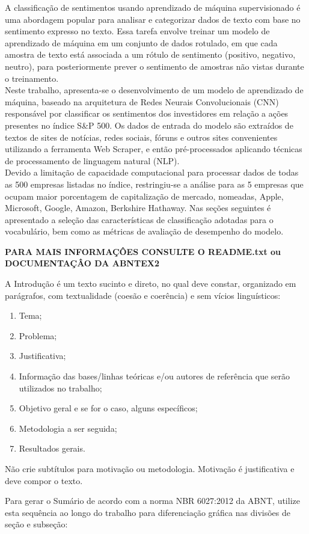 A classificação de sentimentos usando aprendizado de máquina supervisionado é uma abordagem popular para analisar e categorizar dados de texto com base no sentimento expresso no texto. Essa tarefa envolve treinar um modelo de aprendizado de máquina em um conjunto de dados rotulado, em que cada amostra de texto está associada a um rótulo de sentimento (positivo, negativo, neutro), para posteriormente prever o sentimento de amostras não vistas durante o treinamento.\\
Neste trabalho, apresenta-se o desenvolvimento de um modelo de aprendizado de máquina, baseado na arquitetura de Redes Neurais Convolucionais (CNN) responsável por classificar os sentimentos dos investidores em relação a ações presentes no índice S&P 500. Os dados de entrada do modelo são extraídos de textos de sites de notícias, redes sociais, fóruns e outros sites convenientes utilizando a ferramenta Web Scraper, e então pré-processados aplicando técnicas de processamento de linguagem natural (NLP).\\
Devido a limitação de capacidade computacional para processar dados de todas as 500 empresas listadas no índice, restringiu-se a análise para as 5 empresas que ocupam maior porcentagem de capitalização de mercado, nomeadas, Apple, Microsoft, Google, Amazon, Berkshire Hathaway. Nas seções seguintes é apresentado a seleção das características de classificação adotadas para o vocabulário, bem como as métricas de avaliação de desempenho do modelo.\\

{\color{red}
\textbf{PARA MAIS INFORMAÇÔES CONSULTE O README.txt ou DOCUMENTAÇÂO DA ABNTEX2}

A Introdução é um texto sucinto e direto, no qual deve constar, organizado em parágrafos, com textualidade (coesão e coerência) e sem vícios linguísticos:

\begin{enumerate}[label=\alph*)]
	\item Tema;
	\item Problema;
	\item Justificativa;
    \item Informação das bases/linhas teóricas e/ou autores de referência que serão utilizados no trabalho;
    \item Objetivo geral e se for o caso, alguns específicos;
    \item Metodologia a ser seguida;
    \item Resultados gerais.
\end{enumerate}


Não crie subtítulos para motivação ou metodologia. Motivação é justificativa e deve compor o texto.

Para gerar o Sumário de acordo com a norma NBR 6027:2012 da ABNT, utilize esta sequência ao longo do trabalho para diferenciação gráfica nas divisões de seção e subseção:
}

